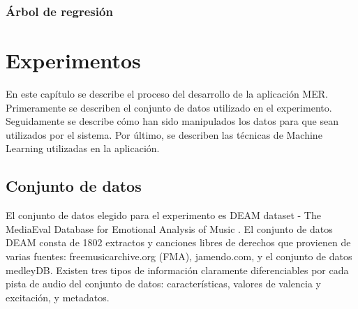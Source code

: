 \documentclass[12pt,a4paper,Spanish]{book}
\begin{document}
\subsection{Árbol de regresión}


\chapter{Experimentos}
En este capítulo se describe el proceso del desarrollo de la aplicación MER. Primeramente se describen el conjunto de datos utilizado en el experimento. Seguidamente se describe cómo han sido manipulados los datos para que sean utilizados por el sistema. Por último, se describen las técnicas de Machine Learning utilizadas en la aplicación.
\section{Conjunto de datos}
El conjunto de datos elegido para el experimento es DEAM dataset - The MediaEval Database for Emotional Analysis of Music \cite{AlajankiEmoInMusicAnalysis}. El conjunto de datos DEAM consta de 1802 extractos y canciones libres de derechos que provienen de varias fuentes: freemusicarchive.org (FMA), jamendo.com,
y el conjunto de datos medleyDB.
\newline
Existen tres tipos de información claramente diferenciables por cada pista de audio del conjunto de datos: características, valores de valencia y excitación, y metadatos.
\end{document}
